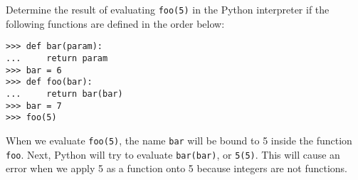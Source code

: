 \question Determine the result of evaluating \texttt{foo(5)} in the Python
interpreter if the following functions are defined in the order below:
\begin{lstlisting}
>>> def bar(param):
...     return param
>>> bar = 6
>>> def foo(bar):
...     return bar(bar)
>>> bar = 7
>>> foo(5)
\end{lstlisting}

\begin{solution}[1in]
When we evaluate \texttt{foo(5)}, the name \texttt{bar} will be bound to 5
inside the function \texttt{foo}. Next, Python will try to evaluate
\texttt{bar(bar)}, or \texttt{5(5)}. This will cause an error when we apply 5
as a function onto 5 because integers are not functions.
\end{solution}
